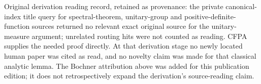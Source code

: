 Original derivation reading record, retained as provenance: the private canonical-index title query for spectral-theorem,
unitary-group and positive-definite-function sources returned no
relevant exact original source for the unitary-measure argument;
unrelated routing hits were not counted as reading. CFPA supplies the
needed proof directly. At that derivation stage no newly located human paper was cited as read,
and no novelty claim was made for that classical analytic lemma. The Bochner attribution above was added for this publication edition; it does not retrospectively expand the derivation's source-reading claim.
